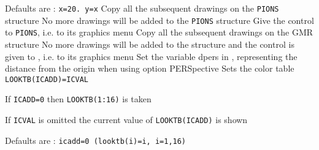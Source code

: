 Defaults are : {\tt x=20.  y=x}
 Copy all the subsequent drawings on the {\tt PIONS} structure
 No more drawings will be added to the {\tt PIONS} structure
 Give the control to {\tt PIONS}, i.e. to its graphics menu
 Copy all the subsequent drawings on the GMR structure
No more drawings will be added to the  structure
and the control is given to , i.e. to its graphics menu
Set the variable dpers in , representing
the distance from the origin when using option PERSpective
Sets the color table {\tt LOOKTB(ICADD)=ICVAL }
 
If {\tt ICADD=0} then {\tt LOOKTB(1:16)} is taken
 
If {\tt ICVAL} is omitted the current value of {\tt LOOKTB(ICADD)} is
shown
 
Defaults are : {\tt icadd=0  (looktb(i)=i, i=1,16)}
 
 
